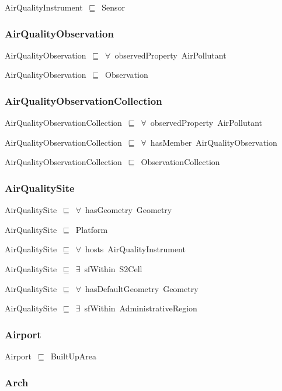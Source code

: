 \documentclass{article}
\begin{document}
AirQualityInstrument~\ensuremath{\sqsubseteq}~Sensor~

\subsubsection*{AirQualityObservation}

AirQualityObservation~\ensuremath{\sqsubseteq}~\ensuremath{\forall}~observedProperty~AirPollutant~

AirQualityObservation~\ensuremath{\sqsubseteq}~Observation~

\subsubsection*{AirQualityObservationCollection}

AirQualityObservationCollection~\ensuremath{\sqsubseteq}~\ensuremath{\forall}~observedProperty~AirPollutant~

AirQualityObservationCollection~\ensuremath{\sqsubseteq}~\ensuremath{\forall}~hasMember~AirQualityObservation~

AirQualityObservationCollection~\ensuremath{\sqsubseteq}~ObservationCollection~

\subsubsection*{AirQualitySite}

AirQualitySite~\ensuremath{\sqsubseteq}~\ensuremath{\forall}~hasGeometry~Geometry~

AirQualitySite~\ensuremath{\sqsubseteq}~Platform~

AirQualitySite~\ensuremath{\sqsubseteq}~\ensuremath{\forall}~hosts~AirQualityInstrument~

AirQualitySite~\ensuremath{\sqsubseteq}~\ensuremath{\exists}~sfWithin~S2Cell~

AirQualitySite~\ensuremath{\sqsubseteq}~\ensuremath{\forall}~hasDefaultGeometry~Geometry~

AirQualitySite~\ensuremath{\sqsubseteq}~\ensuremath{\exists}~sfWithin~AdministrativeRegion~

\subsubsection*{Airport}

Airport~\ensuremath{\sqsubseteq}~BuiltUpArea~

\subsubsection*{Arch}
\end{document}
